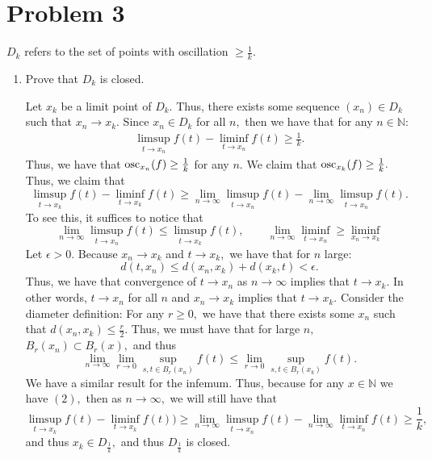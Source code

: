 \documentclass[11pt]{article}
\newcommand{\bbN}{\mathbb{N}}
\begin{document}
\newpage
\section*{Problem 3}
\begin{problem}
    $D_k$ refers to the set of points
 with oscillation $\geq \frac{1}{k}$.
\end{problem}
\begin{enumerate}
    \item 
    \begin{problem}
            Prove that $D_k$ is closed.
    \end{problem}
    \begin{solution}
        Let $x_k$ be a limit point of $D_k.$ Thus, there exists some sequence $(x_n)\in D_k$ such that $x_n \to x_k.$ Since $x_n \in D_k$ for all $n,$ then we have that for any $n\in \bbN:$
        \begin{align}
            \limsup_{t\to x_n}f(t) - \liminf_{t\to x_n}f(t)\geq \frac{1}{k}.
        \end{align} Thus, we have that $\text{osc}_{x_n}(f)\geq \frac{1}{k}$ for any $n.$ We claim that $\text{osc}_{x_k}(f)\geq \frac{1}{k}.$ Thus, we claim that 
        \[\limsup_{t\to x_k}f(t) - \liminf_{t\to x_k}f(t)\geq  \lim_{n\to \infty}\limsup_{t\to x_n}f(t) - \lim_{n\to \infty}\limsup_{t\to x_n}f(t).\]
        To see this, it suffices to notice that 
        \[\lim_{n\to \infty}\limsup_{t\to x_n}f(t) \leq \limsup_{t\to x_k}f(t),\qquad \lim_{n\to \infty}\liminf_{t\to x_n} \geq \liminf_{x_n\to x_k}\] Let $\epsilon>0.$ Because $x_n \to x_k$ and $t\to x_k,$ we have that for $n$ large:
        \[d(t,x_n)\leq d(x_n,x_k) + d(x_k, t)<\epsilon.\] Thus, we have that convergence of $t\to x_n$ as $n\to \infty$ implies that $t\to x_k.$ In other words, $t\to x_n$ for all $n$ and $x_n \to x_k$ implies that $t\to x_k.$  Consider the diameter definition: For any $r\geq 0,$ we have that there exists some $x_n$ such that $d(x_n, x_k)\leq \frac{r}{2}.$ Thus, we must have that for large $n,$ $B_r(x_n)\subset B_r(x),$ and thus
        \[\lim_{n\to \infty}\lim_{r\to 0}\sup_{s,t\in B_r(x_n)}f(t)\leq \lim_{r\to 0}\sup_{s,t\in B_r(x_k)}f(t).\] We have a similar result for the infemum. Thus, because for any $x\in \bbN$ we have $(2),$ then as $n\to \infty,$ we will still have that \[\limsup_{t\to x_k}f(t) - \liminf_{t\to x_k}f(t)) \geq  \lim_{n\to \infty}\limsup_{t\to x_n}f(t) - \lim_{n\to \infty}\liminf_{t\to x_n}f(t)\geq \frac{1}{k},\] and thus $x_k \in D_{\frac{1}{k}},$ and thus $D_{\frac{1}{k}}$ is closed.
    \end{solution}

\end{enumerate}
\end{document}
